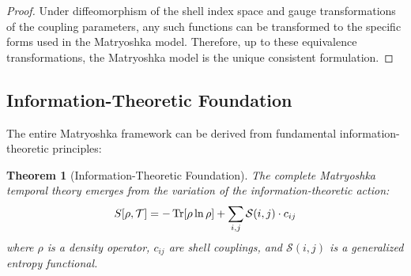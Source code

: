 \documentclass[12pt,a4paper]{article}
\newtheorem{theorem}{Theorem}[section]
\begin{document}
\begin{proof}
Under diffeomorphism of the shell index space and gauge transformations of the coupling parameters, any such functions can be transformed to the specific forms used in the Matryoshka model. Therefore, up to these equivalence transformations, the Matryoshka model is the unique consistent formulation.
\end{proof}

\subsection{Information-Theoretic Foundation}
\label{subsec:information-theory}

The entire Matryoshka framework can be derived from fundamental information-theoretic principles:

\begin{theorem}[Information-Theoretic Foundation]
\label{thm:information-theory}
The complete Matryoshka temporal theory emerges from the variation of the information-theoretic action:
\begin{equation}
S[\rho, \mathcal{T}] = -\Tr[\rho \ln \rho] + \sum_{i,j} \mathcal{S}(i,j) \cdot c_{ij}
\end{equation}
where $\rho$ is a density operator, $c_{ij}$ are shell couplings, and $\mathcal{S}(i,j)$ is a generalized entropy functional.
\end{theorem}
\end{document}
